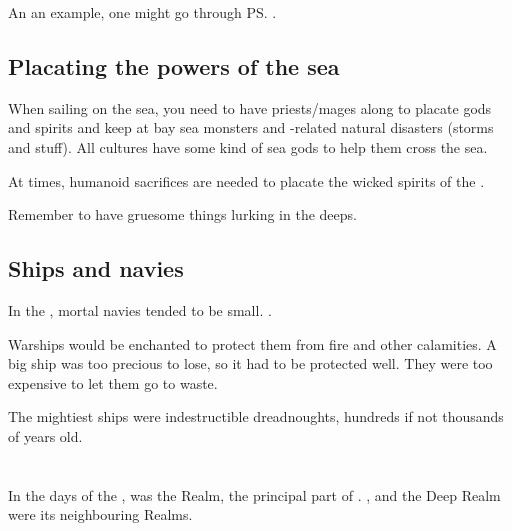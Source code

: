 An an example, one might go through \ps{\QuessanthIshnaruchaefir} . 









\subsection{Placating the powers of the sea}
When sailing on the sea, you need to have priests/mages along to placate gods and spirits and keep at bay sea monsters and \Wylde{}-related natural disasters (storms and stuff). 
All cultures have some kind of sea gods to help them cross the sea. 

At times, humanoid sacrifices are needed to placate the wicked spirits of the .

Remember to have gruesome things lurking in the deeps. 










\subsection{Ships and navies}
In the , mortal navies tended to be small. 
. 

Warships would be enchanted to protect them from fire and other calamities. 
A big ship was too precious to lose, so it had to be protected well. 
They were too expensive to let them go to waste. 

The mightiest ships were indestructible dreadnoughts, hundreds if not thousands of years old. 















\section{\Tembrae}
In the days of the \secondbanewar, \Tembrae{} was the  Realm, the principal part of \Miith{}. 
\Machai{}, \Nyx{} and the Deep Realm were its neighbouring Realms. 








